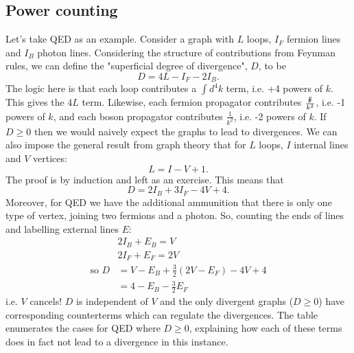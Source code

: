 \subsection{Power counting}
%
Let's take QED as an example. Consider a graph with $L$ loops, $I_F$ fermion lines and $I_B$ photon lines. Considering the structure of contributions from Feynman rules, we can define the "superficial degree of divergence", $D$, to be
\begin{equation}
D = 4L - I_F - 2I_B.
\end{equation}
The logic here is that each loop contributes a $\int d^4k$ term, i.e. +4 powers of $k$. This gives the $4L$ term. Likewise, each fermion propagator contributes $\frac{\slashed{k}}{k^2}$, i.e. -1 powers of $k$, and each boson propagator contributes $\frac{1}{k^2}$, i.e. -2 powers of $k$. If $D \geq 0 $ then we would naively expect the graphs to lead to divergences. We can also impose the general result from graph theory that for $L$ loops, $I$ internal lines and $V$ vertices:
\begin{equation}
L = I - V + 1.
\end{equation}
The proof is by induction and left as an exercise. This means that
\begin{equation}
D = 2I_B + 3I_F - 4V + 4.
\end{equation}
Moreover, for QED we have the additional ammunition that there is only one type of vertex, joining two fermions and a photon. So, counting the ends of lines and labelling external lines $E$:
\begin{equation}
\begin{split}
&2I_B + E_B = V \\
&2I_F + E_F = 2V \\
\text{so } D &= V-E_B + \frac{3}{2}(2V-E_F) - 4V + 4 \\
&= 4 - E_B - \frac{3}{2}E_F
\end{split}
\end{equation}
i.e. $V$ cancels! $D$ is independent of $V$ and the only divergent graphs ($D \geq 0$) have corresponding counterterms which can regulate the divergences. The table enumerates the cases for QED where $D \geq 0$, explaining how each of these terms does in fact not lead to a divergence in this instance.
